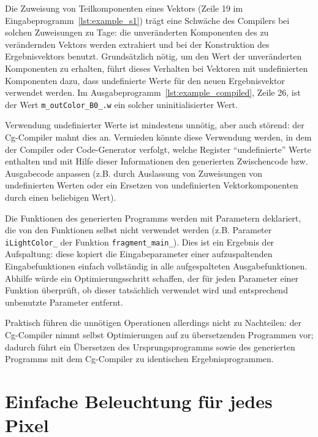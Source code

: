 \documentclass[twoside,a4paper,fleqn,12pt]{book}
\begin{document}
Die Zuweisung von Teilkomponenten eines Vektors (Zeile 19 im Eingabeprogramm~\ref{lst:example_s1}) trägt eine Schwäche des Compilers 
bei solchen Zuweisungen zu Tage: die unveränderten Komponenten des zu verändernden Vektors werden extrahiert
und bei der Konstruktion des Ergebnisvektors benutzt. Grundsätzlich nötig, um den Wert der unveränderten Komponenten
zu erhalten, führt dieses Verhalten bei Vektoren mit undefinierten Komponenten dazu, dass undefinierte Werte für den neuen
Ergebnisvektor verwendet werden. Im Ausgabeprogramm~\ref{lst:example_compiled}, Zeile 26, ist der Wert
\verb+m_outColor_B0_.w+ ein solcher uninitialisierter Wert.

Verwendung undefinierter Werte ist mindestens unnötig, aber auch störend: der Cg-Compiler mahnt dies an.
Vermieden könnte diese Verwendung werden, in dem der Compiler oder Code-Generator verfolgt, welche
Register "`undefinierte"' Werte enthalten und mit Hilfe dieser Informationen den generierten Zwischencode bzw. Ausgabecode anpassen (z.B. durch Auslassung von Zuweisungen
von undefinierten Werten oder ein Ersetzen von undefinierten Vektorkomponenten durch einen beliebigen Wert).

Die Funktionen des generierten Programms werden mit Parametern deklariert, die von den Funktionen selbst nicht verwendet
werden (z.B. Parameter \verb+iLightColor_+ der Funktion \verb+fragment_main_+). Dies ist ein Ergebnis der Aufspaltung: diese
kopiert die Eingabeparameter einer aufzuspaltenden Eingabefunktionen einfach vollständig in alle aufgespalteten Ausgabefunktionen. Abhilfe würde ein
Optimierungsschritt schaffen, der für jeden Parameter einer Funktion überprüft, ob dieser tatsächlich verwendet wird und entsprechend
unbenutzte Parameter entfernt.

Praktisch führen die unnötigen Operationen allerdings nicht zu Nachteilen: der Cg-Compiler nimmt selbst Optimierungen
auf zu übersetzenden Programmen vor; dadurch führt ein Übersetzen des Ursprungsprogramms
sowie des generierten Programms mit dem Cg-Compiler zu identischen Ergebnisprogrammen.


\section{Einfache Beleuchtung für jedes Pixel}
\end{document}
